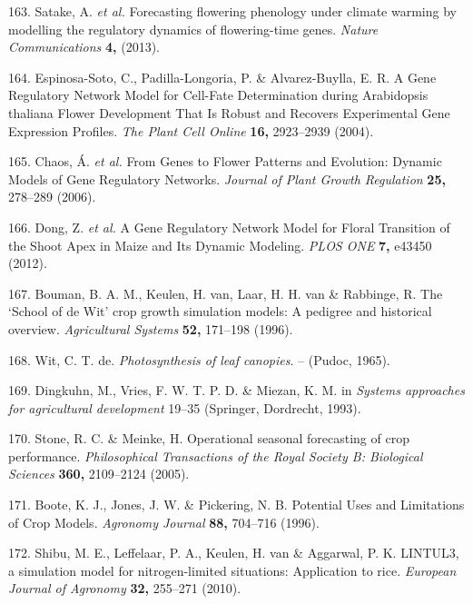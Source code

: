 \documentclass[12pt,]{book}
\begin{document}
\hypertarget{ref-satake_forecasting_2013}{}
163. Satake, A. \emph{et al.} Forecasting flowering phenology under
climate warming by modelling the regulatory dynamics of flowering-time
genes. \emph{Nature Communications} \textbf{4,} (2013).

\hypertarget{ref-espinosa_soto_gene_2004}{}
164. Espinosa-Soto, C., Padilla-Longoria, P. \& Alvarez-Buylla, E. R. A
Gene Regulatory Network Model for Cell-Fate Determination during
Arabidopsis thaliana Flower Development That Is Robust and Recovers
Experimental Gene Expression Profiles. \emph{The Plant Cell Online}
\textbf{16,} 2923--2939 (2004).

\hypertarget{ref-chaos_genes_2006}{}
165. Chaos, Á. \emph{et al.} From Genes to Flower Patterns and
Evolution: Dynamic Models of Gene Regulatory Networks. \emph{Journal of
Plant Growth Regulation} \textbf{25,} 278--289 (2006).

\hypertarget{ref-dong_gene_2012}{}
166. Dong, Z. \emph{et al.} A Gene Regulatory Network Model for Floral
Transition of the Shoot Apex in Maize and Its Dynamic Modeling.
\emph{PLOS ONE} \textbf{7,} e43450 (2012).

\hypertarget{ref-bouman_school_1996}{}
167. Bouman, B. A. M., Keulen, H. van, Laar, H. H. van \& Rabbinge, R.
The `School of de Wit' crop growth simulation models: A pedigree and
historical overview. \emph{Agricultural Systems} \textbf{52,} 171--198
(1996).

\hypertarget{ref-de_wit_photosynthesis_1965}{}
168. Wit, C. T. de. \emph{Photosynthesis of leaf canopies}. -- (Pudoc,
1965).

\hypertarget{ref-dingkuhn_improvement_1993}{}
169. Dingkuhn, M., Vries, F. W. T. P. D. \& Miezan, K. M. in
\emph{Systems approaches for agricultural development} 19--35 (Springer,
Dordrecht, 1993).

\hypertarget{ref-stone_operational_2005}{}
170. Stone, R. C. \& Meinke, H. Operational seasonal forecasting of crop
performance. \emph{Philosophical Transactions of the Royal Society B:
Biological Sciences} \textbf{360,} 2109--2124 (2005).

\hypertarget{ref-boote_potential_1996}{}
171. Boote, K. J., Jones, J. W. \& Pickering, N. B. Potential Uses and
Limitations of Crop Models. \emph{Agronomy Journal} \textbf{88,}
704--716 (1996).

\hypertarget{ref-shibu_lintul3_2010}{}
172. Shibu, M. E., Leffelaar, P. A., Keulen, H. van \& Aggarwal, P. K.
LINTUL3, a simulation model for nitrogen-limited situations: Application
to rice. \emph{European Journal of Agronomy} \textbf{32,} 255--271
(2010).
\end{document}
